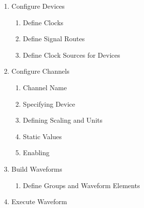 \begin{enumerate}
  \item Configure Devices
    \begin{enumerate}
      \item Define Clocks
      \item Define Signal Routes
      \item Define Clock Sources for Devices
    \end{enumerate}
  \item Configure Channels
    \begin{enumerate}
      \item Channel Name
      \item Specifying Device
      \item Defining Scaling and Units
      \item Static Values
      \item Enabling
    \end{enumerate}
  \item Build Waveforms
    \begin{enumerate}
      \item Define Groups and Waveform Elements
    \end{enumerate}
  \item Execute Waveform
\end{enumerate}
